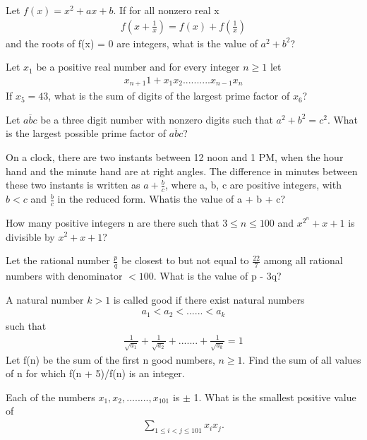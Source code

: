 \item Let $f(x) = x^2 + ax + b$. If for all nonzero real x
\begin{align*}
f(x + \frac{1}{x}) = f(x) + f(\frac{1}{x})
\end{align*}
and the roots of f(x) = 0 are integers, what is the value of $a^2 + b^2$?

\item Let $x_{1}$ be a positive real number and for every integer $n \geq 1$ let 
\begin{align*}
x_{n+1}  1 + x_1 x_2..........x_{n-1}x_n
\end{align*}
If $x_{5} = 43$, what is the sum of digits of the largest prime factor of $x_{6}$?

\item Let $\overline{abc}$ be a three digit number with nonzero digits such that $a^2 + b^2 = c^2$. What is the largest possible prime factor of $\overline{abc}$?

\item On a clock, there are two instants between 12 noon and 1 PM, when the hour hand and the minute hand are at right angles. The difference in minutes between these two instants is written as $a + \frac{b}{c}$, where a, b, c are positive integers, with $b < c$ and $\frac{b}{c}$ in the reduced form. Whatis the value of a + b + c?

\item How many positive integers n are there such that $3 \leq n \leq 100$ and $ x^{2^{n}} + x + 1$ is divisible by 
$x^{2} + x + 1$?

\item Let the rational number $\frac{p}{q}$ be closest to but not equal to $\frac{22}{7}$ among all rational numbers with denominator $ < 100$. What is the value of p - 3q?

\item A natural number $k > 1$ is called good if there exist natural numbers
\begin{align*}
a_{1} < a_{2} <...... < a_{k}
\end{align*}
such that 
\begin{align*}
\frac{1}{\sqrt{a_1}} + \frac{1}{\sqrt{a_2}} +.......+ \frac{1}{\sqrt{a_k}} = 1
\end{align*}
Let f(n) be the sum of the first n good numbers, $n \geq 1$. Find the sum of all values of n for which f(n + 5)/f(n) is an integer.

\item Each of the numbers $x_1, x_2,........, x_{101}$ is $\pm$ 1. What is the smallest positive value of 
\begin{align*}
\sum_{1 \leq i < j \leq 101} x_{i} x_{j}.
\end{align*}

